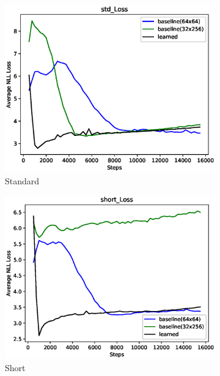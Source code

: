 \begin{figure}[ht]
	\begin{subfigure}{0.5\linewidth}
		\includegraphics[width=0.95\linewidth]{./figs/sr/std-loss-eps}
		\caption{Standard}\label{std-loss}
	\end{subfigure}
	\begin{subfigure}{0.5\linewidth}
		\includegraphics[width=0.95\linewidth]{./figs/sr/short-loss-eps}
		\caption{Short}\label{short-loss}
	\end{subfigure}
	\begin{subfigure}{0.5\linewidth}

\end{subfigure}
\end{figure}
